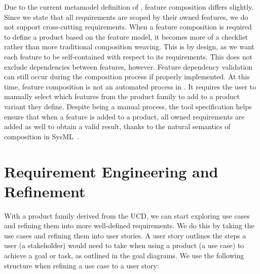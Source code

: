 Due to the current metamodel definition of \tool, feature composition differs slightly. Since we state that all requirements are scoped by their owned features, we do not support cross-cutting requirements. When a feature composition is required to define a product based on the feature model, it becomes more of a checklist rather than more traditional composition weaving. This is by design, as we want each feature to be self-contained with respect to its requirements. This does not exclude dependencies between features, however. Feature dependency validation can still occur during the composition process if properly implemented. At this time, feature composition is not an automated process in \tool. It requires the user to manually select which features from the product family to add to a product variant they define. Despite being a manual process, the tool specification helps ensure that when a feature is added to a product, all owned requirements are added as well to obtain a valid result, thanks to the natural semantics of composition in SysML~\cite{sysml2019omg}.

\section{Requirement Engineering and Refinement}
\label{sec:Req_Engineering_Refinement}

With a product family derived from the UCD, we can start exploring use cases and refining them into more well-defined requirements. We do this by taking the use cases and refining them into user stories. A user story outlines the steps a user (a stakeholder) would need to take when using a product (a use case) to achieve a goal or task, as outlined in the goal diagrams. We use the following structure when refining a use case to a user story:

